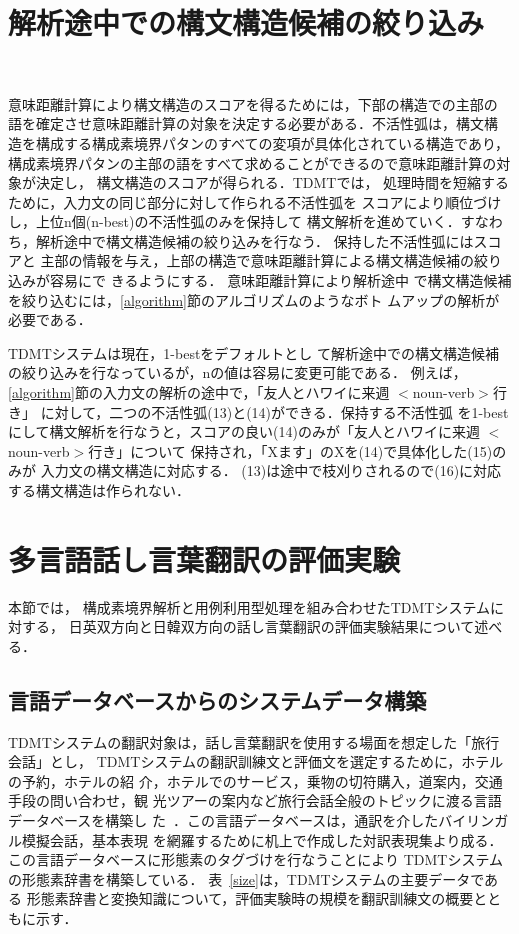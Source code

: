 \section{解析途中での構文構造候補の絞り込み}~\label{n-best}

意味距離計算により構文構造のスコアを得るためには，下部の構造での主部の
語を確定させ意味距離計算の対象を決定する必要がある．不活性弧は，構文構
造を構成する構成素境界パタンのすべての変項が具体化されている構造であり，
構成素境界パタンの主部の語をすべて求めることができるので意味距離計算の対象が決定し，
構文構造のスコアが得られる．TDMTでは，
処理時間を短縮するために，入力文の同じ部分に対して作られる不活性弧を
スコアにより順位づけし，上位n個(n-best)の不活性弧のみを保持して
構文解析を進めていく．すなわち，解析途中で構文構造候補の絞り込みを行なう．
保持した不活性弧にはスコアと
主部の情報を与え，上部の構造で意味距離計算による構文構造候補の絞り込みが容易にで
きるようにする．
意味距離計算により解析途中
で構文構造候補を絞り込むには，\ref{algorithm}節のアルゴリズムのようなボト
ムアップの解析が必要である．

TDMTシステムは現在，1-bestをデフォルトとし
て解析途中での構文構造候補の絞り込みを行なっているが，nの値は容易に変更可能である．
例えば，\ref{algorithm}節の入力文の解析の途中で，「友人とハワイに来週
{\footnotesize $<$}noun-verb{\footnotesize $>$}行き」
に対して，二つの不活性弧(13)と(14)ができる．保持する不活性弧
を1-bestにして構文解析を行なうと，スコアの良い(14)のみが「友人とハワイに来週
{\footnotesize $<$}noun-verb{\footnotesize $>$}行き」について
保持され，「Xます」のXを(14)で具体化した(15)のみが
入力文の構文構造に対応する．
(13)は途中で枝刈りされるので(16)に対応する構文構造は作られない．

\section{多言語話し言葉翻訳の評価実験}

本節では，
構成素境界解析と用例利用型処理を組み合わせたTDMTシステムに対する，
日英双方向と日韓双方向の話し言葉翻訳の評価実験結果について述べる．

\subsection{言語データベースからのシステムデータ構築}

TDMTシステムの翻訳対象は，話し言葉翻訳を使用する場面を想定した「旅行会話」とし，
TDMTシステムの翻訳訓練文と評価文を選定するために，ホテルの予約，ホテルの紹
介，ホテルでのサービス，乗物の切符購入，道案内，交通手段の問い合わせ，観
光ツアーの案内など旅行会話全般のトピックに渡る言語データベースを構築し
た~\cite{Furuse3}．この言語データベースは，通訳を介したバイリンガル模擬会話，基本表現
を網羅するために机上で作成した対訳表現集より成る．
この言語データベースに形態素のタグづけを行なうことにより
TDMTシステムの形態素辞書を構築している．
表~\ref{size}は，TDMTシステムの主要データである
形態素辞書と変換知識について，評価実験時の規模を翻訳訓練文の概要とともに示す．

